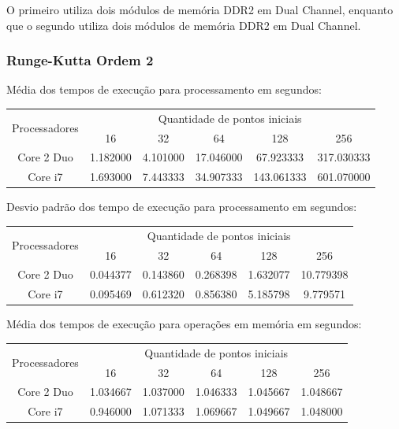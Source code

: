   O primeiro utiliza dois módulos de memória DDR2 em Dual Channel, enquanto que o segundo utiliza dois módulos de memória DDR2 em Dual Channel.
    \subsubsection{Runge-Kutta Ordem 2}
    Média dos tempos de execução para processamento em segundos:\\
    \begin{tabular}{| c | c | c | c | c | c |}
      \hline
      \multirow{2}{*}{Processadores}& \multicolumn{5}{|c|}{Quantidade de pontos iniciais} \\ \cline{2-6}
      & 16 & 32 & 64 & 128 & 256 \\ \hline
      Core 2 Duo & 1.182000 & 4.101000 & 17.046000 & 67.923333 & 317.030333 \\ \hline
      Core i7 & 1.693000 & 7.443333 & 34.907333 & 143.061333 & 601.070000\\ \hline

      \hline
    \end{tabular}
    
    \hspace{1mm}\newline
    
    \noindent Desvio padrão dos tempo de execução para processamento em segundos:\\
    \begin{tabular}{| c | c | c | c | c | c |}
      \hline
      \multirow{2}{*}{Processadores}& \multicolumn{5}{|c|}{Quantidade de pontos iniciais} \\ \cline{2-6}
      & 16 & 32 & 64 & 128 & 256 \\ \hline
      Core 2 Duo & 0.044377 & 0.143860 & 0.268398 & 1.632077 & 10.779398 \\ \hline
      Core i7 &  0.095469 & 0.612320 & 0.856380 & 5.185798 & 9.779571 \\ \hline

      \hline
    \end{tabular}
    
    \hspace{1mm}\newline
    
    \noindent Média dos tempos de execução para operações em memória em segundos:\\
    \begin{tabular}{| c | c | c | c | c | c |}
      \hline
      \multirow{2}{*}{Processadores}& \multicolumn{5}{|c|}{Quantidade de pontos iniciais} \\ \cline{2-6}
      & 16 & 32 & 64 & 128 & 256 \\ \hline
      Core 2 Duo & 1.034667 & 1.037000 & 1.046333 & 1.045667 & 1.048667\\ \hline
      Core i7 & 0.946000 & 1.071333 & 1.069667 & 1.049667 & 1.048000\\ \hline

      \hline
    \end{tabular}
    
